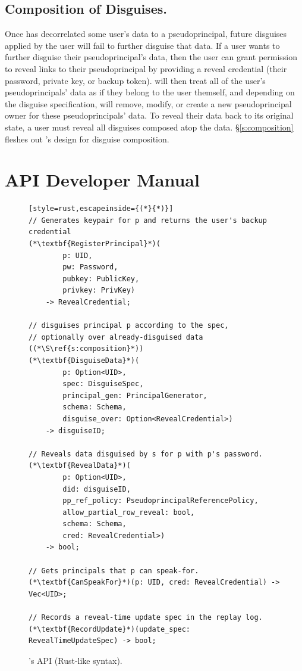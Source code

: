 \subsection{Composition of Disguises.}
Once \sys has decorrelated some user's data to a pseudoprincipal, future
disguises applied by the user will fail to further disguise that data.
%
If a user wants to further disguise their pseudoprincipal's data, then the user
can grant \sys permission to reveal links to their pseudoprincipal by providing
a reveal credential (their password, private key, or backup token). 
%
\sys will then treat all of the user's pseudoprincipals' data as if they belong
to the user themself, and depending on the disguise specification, will remove,
modify, or create a new pseudoprincipal owner for these pseudoprincipals' data.
%
To reveal their data back to its original state, a user must reveal all
disguises composed atop the data.
%
\S\ref{s:composition} fleshes out \sys's design for disguise composition.

%
\section{API Developer Manual}
\label{s:api}

\begin{figure}[t]
\begin{lstlisting}[style=rust,escapeinside={(*}{*)}]
// Generates keypair for p and returns the user's backup credential
(*\textbf{RegisterPrincipal}*)(
        p: UID, 
        pw: Password,
        pubkey: PublicKey, 
        privkey: PrivKey)
    -> RevealCredential;

// disguises principal p according to the spec, 
// optionally over already-disguised data ((*\S\ref{s:composition}*))
(*\textbf{DisguiseData}*)(
        p: Option<UID>, 
        spec: DisguiseSpec,
        principal_gen: PrincipalGenerator,
        schema: Schema,
        disguise_over: Option<RevealCredential>) 
    -> disguiseID;

// Reveals data disguised by s for p with p's password. 
(*\textbf{RevealData}*)(
        p: Option<UID>, 
        did: disguiseID, 
        pp_ref_policy: PseudoprincipalReferencePolicy,
        allow_partial_row_reveal: bool,
        schema: Schema,
        cred: RevealCredential>)
    -> bool;

// Gets principals that p can speak-for.
(*\textbf{CanSpeakFor}*)(p: UID, cred: RevealCredential) -> Vec<UID>;

// Records a reveal-time update spec in the replay log.
(*\textbf{RecordUpdate}*)(update_spec: RevealTimeUpdateSpec) -> bool;
\end{lstlisting}
\caption{\sys's API (Rust-like syntax).}
\label{f:api-high}
\end{figure}
%

